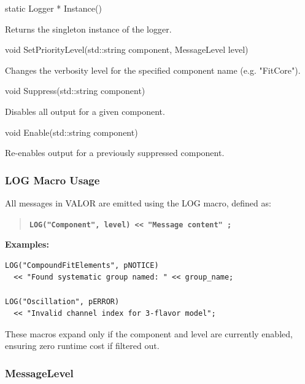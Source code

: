 \begin{description}[align=left]

  \item[] {\color{cadmiumred} static Logger * Instance()}

  Returns the singleton instance of the logger.

  \item[] {\color{cadmiumred} void SetPriorityLevel(std::string component, MessageLevel level)}

  Changes the verbosity level for the specified component name (e.g. {\color{amber}"FitCore"}).

  \item[] {\color{cadmiumred} void Suppress(std::string component)}

  Disables all output for a given component.

  \item[] {\color{cadmiumred} void Enable(std::string component)}

  Re-enables output for a previously suppressed component.

\end{description}

\vspace{1em}
\subsubsection*{\color{cadmiumgreen}\bf LOG Macro Usage}

All messages in VALOR are emitted using the {\color{cadmiumgreen} LOG} macro, defined as:

\begin{quote}
{\bf \tt LOG("Component", level) << "Message content" ;}
\end{quote}

\noindent\textbf{Examples:}

\begin{lstlisting}
LOG("CompoundFitElements", pNOTICE) 
  << "Found systematic group named: " << group_name;

LOG("Oscillation", pERROR) 
  << "Invalid channel index for 3-flavor model";
\end{lstlisting}

These macros expand only if the component and level are currently enabled, ensuring zero runtime cost if filtered out.

\vspace{1em}
\subsubsection*{\color{cadmiumgreen}\bf MessageLevel}

